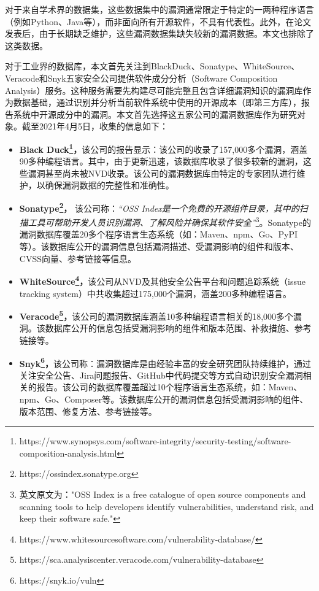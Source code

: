 对于来自学术界的数据集\cite{ponta2019manually,fan2020ac,jimenez2018enabling,gkortzis2018vulinoss,namrud2019androvul,li2017large,liu2020large,antal2020exploring}，这些数据集中的漏洞通常限定于特定的一两种程序语言（例如Python、Java等），而非面向所有开源软件，不具有代表性。此外，在论文发表后，由于长期缺乏维护，这些漏洞数据集缺失较新的漏洞数据。本文也排除了这类数据。

对于工业界的数据库，本文首先关注到BlackDuck、Sonatype、WhiteSource、Veracode和Snyk五家安全公司提供软件成分分析（Software Composition Analysis）服务。这种服务需要先构建尽可能完整且包含详细漏洞知识的漏洞库作为数据基础，通过识别并分析当前软件系统中使用的开源成本（即第三方库），报告系统中开源成分中的漏洞。本文首先选择这五家公司的漏洞数据库作为研究对象。截至2021年4月5日，收集的信息如下：

\begin{itemize}[leftmargin=*]
\item\textbf{Black Duck\footnote{https://www.synopsys.com/software-integrity/security-testing/software-composition-analysis.html}，}该公司的报告显示：该公司的收录了157,000多个漏洞，涵盖90多种编程语言。其中，由于更新迅速，该数据库收录了很多较新的漏洞，这些漏洞甚至尚未被NVD收录。该公司的漏洞数据库由特定的专家团队进行维护，以确保漏洞数据的完整性和准确性。%
\item\textbf{Sonatype\footnote{https://ossindex.sonatype.org}，} 该公司称：\textit{“OSS Index是一个免费的开源组件目录，其中的扫描工具可帮助开发人员识别漏洞、了解风险并确保其软件安全”}\footnote{英文原文为："OSS Index is a free catalogue of open source components and scanning tools to help developers identify vulnerabilities, understand risk, and keep their software safe."}。Sonatype的漏洞数据库覆盖20多个程序语言生态系统（如：Maven、npm、Go、PyPI等）。该数据库公开的漏洞信息包括漏洞描述、受漏洞影响的组件和版本、CVSS向量、参考链接等信息。
\item\textbf{WhiteSource\footnote{https://www.whitesourcesoftware.com/vulnerability-database/}，}该公司从NVD及其他安全公告平台和问题追踪系统（issue tracking system）中共收集超过175,000个漏洞，涵盖200多种编程语言。
\item\textbf{Veracode\footnote{https://sca.analysiscenter.veracode.com/vulnerability-database}，}该公司的漏洞数据库涵盖10多种编程语言相关的18,000多个漏洞。该数据库公开的信息包括受漏洞影响的组件和版本范围、补救措施、参考链接等。
\item\textbf{Snyk\footnote{https://snyk.io/vuln}，}该公司称：漏洞数据库是由经验丰富的安全研究团队持续维护，通过关注安全公告、Jira问题报告、GitHub中代码提交等方式自动识别安全漏洞相关的报告。该公司的数据库覆盖超过10个程序语言生态系统，如：Maven、npm、Go、Composer等。该数据库公开的漏洞信息包括受漏洞影响的组件、版本范围、修复方法、参考链接等。
\end{itemize}

